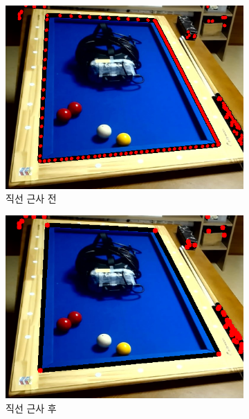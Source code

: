 \documentclass[10pt]{oblivoir}
\begin{document}
\begin{figure}[ht]
    \centering
    \begin{subfigure}{0.4\textwidth}
        \includegraphics[width=\textwidth]{img/billiards-table-contours-dot-view.png}
        \caption{직선 근사 전}
        \label{fig;table-many-dots}
    \end{subfigure}
    \begin{subfigure}{0.4\textwidth}
        \includegraphics[width=\textwidth]{img/billiards-table-contours-dot-view-approx.png}
        \caption{직선 근사 후}
        \label{fig;table-approximated}
    \end{subfigure}
    \caption{}
\end{figure}
\end{document}
